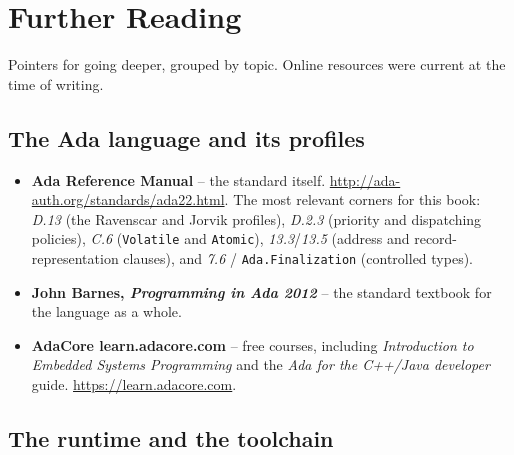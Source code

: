 \chapter{Further Reading}
\label{ch:references}

Pointers for going deeper, grouped by topic. Online resources were current at the
time of writing.

\section{The Ada language and its profiles}

\begin{itemize}
\item \textbf{Ada Reference Manual} -- the standard itself.
  \url{http://ada-auth.org/standards/ada22.html}. The most relevant corners for
  this book: \emph{D.13} (the Ravenscar and Jorvik profiles), \emph{D.2.3}
  (priority and dispatching policies), \emph{C.6} (\texttt{Volatile} and
  \texttt{Atomic}), \emph{13.3}/\emph{13.5} (address and record-representation
  clauses), and \emph{7.6} / \texttt{Ada.Finalization} (controlled types).
\item \textbf{John Barnes, \emph{Programming in Ada 2012}} -- the standard
  textbook for the language as a whole.
\item \textbf{AdaCore learn.adacore.com} -- free courses, including
  \emph{Introduction to Embedded Systems Programming} and the
  \emph{Ada for the C++/Java developer} guide. \url{https://learn.adacore.com}.
\end{itemize}

\section{The runtime and the toolchain}

